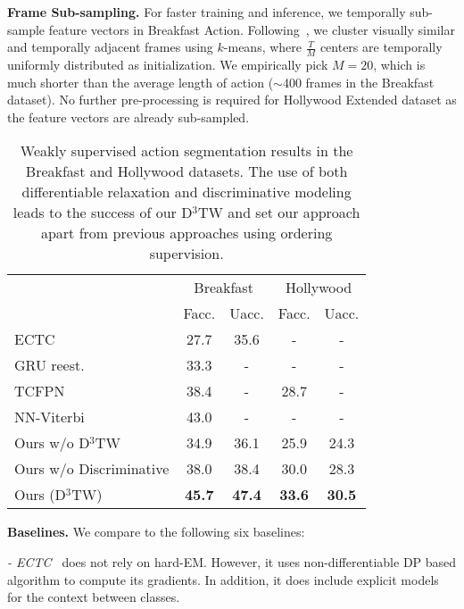 \documentclass[10pt,twocolumn,letterpaper]{article}
\newcommand{\dttw}{D${}^3$TW\xspace}
\begin{document}
\vspace{1mm}
{\noindent \bf Frame Sub-sampling.} For faster training and inference, we temporally sub-sample feature vectors in Breakfast Action. Following~\cite{huang2016connectionist}, we cluster visually similar and temporally adjacent frames using $k$-means, where $\frac{T}{M}$ centers are temporally uniformly distributed as initialization. We empirically pick $M=20$, which is much shorter than the average length of action ($\sim$400 frames in the Breakfast dataset). No further pre-processing is required for  Hollywood Extended dataset as the feature vectors are already sub-sampled.


\begin{table}
\small

\begin{center}
\begin{tabular}{lcccc}
\toprule
& \multicolumn{2}{c}{Breakfast} & \multicolumn{2}{c}{Hollywood} \\
 & Facc.  & Uacc. & Facc. & Uacc.\\
\midrule
ECTC\cite{huang2016connectionist} & 27.7 & 35.6 & - & -\\
GRU reest.\cite{richard2017weakly} & 33.3 & - & - & - \\
TCFPN\cite{ding2018weakly} & 38.4 & - & 28.7 & - \\
NN-Viterbi\cite{richard2018neuralnetwork} & 43.0 & - & - & - \\
\hline
Ours w/o D${}^3$TW  & 34.9 & 36.1  &25.9 & 24.3 \\
Ours w/o Discriminative  & 38.0 & 38.4  & 30.0 & 28.3 \\
Ours (D${}^3$TW) & {\bf 45.7} & {\bf 47.4} & {\bf 33.6} & {\bf 30.5}\\
\bottomrule
\end{tabular}
\end{center}
\caption{
Weakly supervised action segmentation results in the Breakfast and Hollywood datasets. The use of both differentiable relaxation and discriminative modeling leads to the success of our \dttw and set our approach apart from previous approaches using ordering supervision.}
\vspace{-3mm}
\label{tab:segmentation}
\end{table}

\vspace{1mm}
{\noindent \bf Baselines.} We compare to the following six baselines:

{\noindent \it  - ECTC~\cite{huang2016connectionist}} does not rely on hard-EM. However, it uses non-differentiable DP based algorithm to compute its gradients. In addition, it does
include explicit models for the context between classes.
\end{document}
